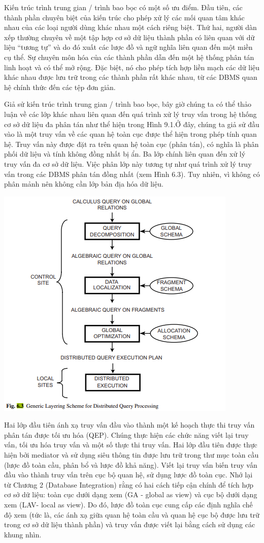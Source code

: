 \documentclass[a4paper]{article}
\begin{document}
Kiến trúc trình trung gian / trình bao bọc có một số ưu điểm. Đầu tiên, các thành phần chuyên biệt của kiến ​​trúc cho phép xử lý các mối quan tâm khác nhau của các loại người dùng khác nhau một cách riêng biệt. Thứ hai, người dàn xếp thường chuyên về một tập hợp cơ sở dữ liệu thành phần có liên quan với dữ liệu “tương tự” và do đó xuất các lược đồ và ngữ nghĩa liên quan đến một miền cụ thể. Sự chuyên môn hóa của các thành phần dẫn đến một hệ thống phân tán linh hoạt và có thể mở rộng. Đặc biệt, nó cho phép tích hợp liền mạch các dữ liệu khác nhau được lưu trữ trong các thành phần rất khác nhau, từ các DBMS quan hệ chính thức đến các tệp đơn giản.

Giả sử kiến ​​trúc trình trung gian / trình bao bọc, bây giờ chúng ta có thể thảo luận về các lớp khác nhau liên quan đến quá trình xử lý truy vấn trong hệ thống cơ sở dữ liệu đa phân tán như thể hiện trong Hình 9.1.Ở đây, chúng ta giả sử đầu vào là một truy vấn về các quan hệ toàn cục được thể hiện trong phép tính quan hệ. Truy vấn này được đặt ra trên quan hệ toàn cục (phân tán), có nghĩa là phân phối dữ liệu và tính không đồng nhất bị ẩn. Ba lớp chính liên quan đến xử lý truy vấn đa cơ sở dữ liệu. Việc phân lớp này tương tự như quá trình xử lý truy vấn trong các DBMS phân tán đồng nhất (xem Hình 6.3). Tuy nhiên, vì không có phân mảnh nên không cần lớp bản địa hóa dữ liệu.

\includegraphics[width=0.8\linewidth]{image/3/6.3}

Hai lớp đầu tiên ánh xạ truy vấn đầu vào thành một kế hoạch thực thi truy vấn phân tán được tối ưu hóa (QEP). Chúng thực hiện các chức năng viết lại truy vấn, tối ưu hóa truy vấn
và một số thực thi truy vấn. Hai lớp đầu tiên được thực hiện bởi mediator và
sử dụng siêu thông tin được lưu trữ trong thư mục toàn cầu (lược đồ toàn cầu, phân bổ và
lược đồ khả năng). Viết lại truy vấn biến truy vấn đầu vào thành truy vấn trên cục bộ
quan hệ, sử dụng lược đồ toàn cục. Nhớ lại từ Chương 2 (Database Integration) rằng có hai cách tiếp cận chính để tích hợp cơ sở dữ liệu: toàn cục dưới dạng xem (GA - global as view) và cục bộ dưới dạng xem (LAV- local as view).
Do đó, lược đồ toàn cục cung cấp các định nghĩa chế độ xem (tức là, các ánh xạ giữa
quan hệ toàn cầu và quan hệ cục bộ được lưu trữ trong cơ sở dữ liệu thành phần) và
truy vấn được viết lại bằng cách sử dụng các khung nhìn.
\end{document}
